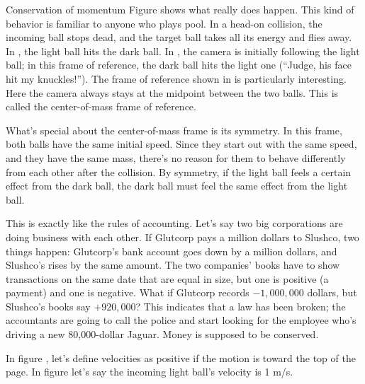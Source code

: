 \begin{envsubsection}{Conservation of momentum}
Figure  shows what really does happen. This kind of behavior is
familiar to anyone who plays pool. In a head-on collision, the incoming ball stops
dead, and the target ball takes all its energy and flies away. In ,
the light ball hits the dark ball. In , the camera is initially following
the light ball; in this frame of reference, the dark ball hits the light one (``Judge,
his face hit my knuckles!''). The frame of reference shown in
 is particularly interesting. Here the
camera always stays at the midpoint between the two balls. This is called the
center-of-mass frame of reference.



What's special about the center-of-mass frame is its symmetry. In this frame, both balls
have the same initial speed. Since they start out with the same speed, and they have the
same mass, there's no reason for them to behave differently from each other after the collision.
By symmetry, if the light ball feels a certain effect from the dark ball, the dark ball must feel
the same effect from the light ball. 

This is exactly like the rules of accounting. Let's say two big corporations are
doing business with each other. If Glutcorp pays a million dollars to Slushco,
two things happen: Glutcorp's bank account goes down by a million dollars, and
Slushco's rises by the same amount. The two companies' books have to show
transactions on the same date that are equal in size, but one is positive
(a payment) and one is negative. What if Glutcorp records $-1,000,000$ dollars,
but Slushco's books say $+920,000$? This indicates that a law has been broken;
the accountants are going to call the police and start looking for the employee who's
driving a new 80,000-dollar Jaguar. Money is supposed to be conserved.

In figure , let's define velocities as positive if the motion
is toward the top of the page. In figure 
let's say the incoming light ball's velocity is 1 m/s.


\end{envsubsection}

